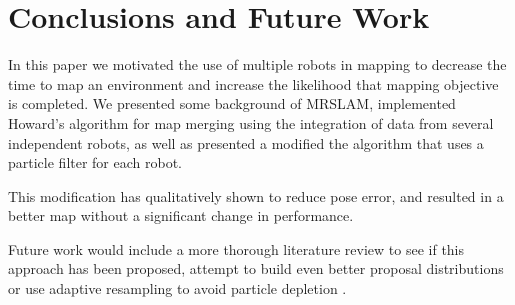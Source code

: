 \section{Conclusions and Future Work}

In this paper we motivated the use of multiple robots in mapping to decrease the time to map an environment and increase the likelihood that mapping objective is completed.  We presented some background of MRSLAM, implemented Howard’s algorithm for map merging using the integration of data from several independent robots, as well as presented a modified the algorithm that uses a particle filter for each robot.  

This modification has qualitatively shown to reduce pose error, and resulted in a better map without a significant change in performance.

Future work would include a more thorough literature review to see if this approach has been proposed, attempt to build even better proposal distributions or use adaptive resampling to avoid particle depletion \cite{Grisetti2007}.
